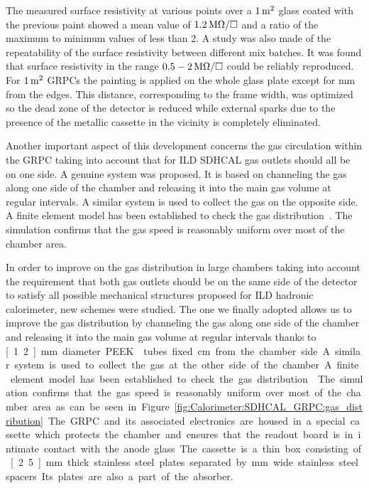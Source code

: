 The measured surface resistivity at various points over a $\unit[1]{m^2}$ glass coated
with the previous paint showed a mean value of $\unit[1.2]{M\Omega/\square}$ and a
ratio of the maximum to minimum values of less than 2. A study was also made of
the repeatability of the surface resistivity between different mix batches. It
was found that surface resistivity in the range $\unit[0.5-2]{M\Omega/\square}$ could be
reliably reproduced. For $\unit[1]{m^2}$ GRPCs the painting is applied on the whole
glass plate except for \unit[3]{mm} from the edges. This distance, corresponding to the
frame width, was optimized so the dead zone of the detector is reduced while
external sparks due to the presence of the metallic cassette in the vicinity is
completely eliminated.

Another important aspect of this development concerns the gas circulation within
the GRPC taking into account that for ILD SDHCAL gas outlets should all be on
one side. A genuine system was proposed. It is based on channeling the gas
along one side of the chamber and releasing it into the main gas volume at
regular intervals. A similar system is used to collect the gas on the opposite
side. A finite element model has been established to check the gas
distribution~\cite{Bedjidian2010120}. The simulation confirms that the gas speed is
reasonably uniform over most of the chamber area.


In order to improve on the gas distribution in large chambers taking into
account the requirement that both gas outlets should be on the same side of the
detector to satisfy all possible mechanical structures proposed for ILD
hadronic calorimeter, new schemes were studied. The one we finally adopted
allows us to improve the gas distribution by channeling the gas along one side
of the chamber and releasing it into the main gas volume at regular intervals
thanks to \unit[1.2]{mm} diameter PEEK\texttrademark tubes fixed \unit[2]{cm} from the
chamber side. A similar system is used to collect the gas at the other side of
the chamber. A finite element model has been established to check the gas
distribution~\cite{Bedjidian2010120}. The simulation confirms that the gas speed is
reasonably uniform over most of the chamber area. as can be seen in
Figure~\ref{fig:Calorimeter:SDHCAL_GRPC:gas_distribution}.

The GRPC and its associated electronics are housed in a special cassette which
protects the chamber and ensures that the readout board is in intimate contact
with the anode glass. The cassette is a thin box consisting of \unit[2.5]{mm} thick
stainless steel plates separated by \unit[6]{mm} wide stainless steel spacers. Its
plates are also a part of the absorber.

